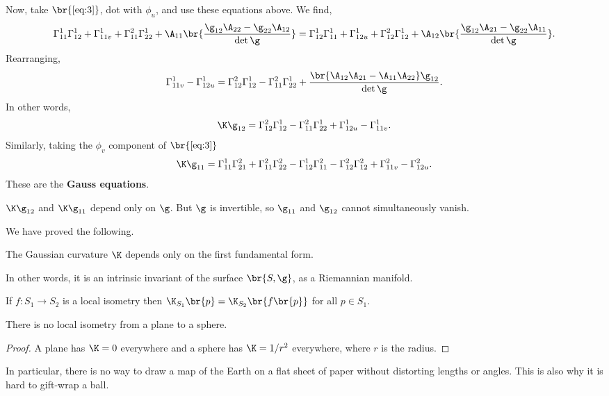 Now, take $ \br{\ref{eq:3}} $, dot with $ \phi_u $, and use these equations above. We find,
$$ \Gamma_{11}^1\Gamma_{12}^1 + \Gamma_{11v}^1 + \Gamma_{11}^2\Gamma_{22}^1 + \A_{11}\br{\dfrac{\g_{12}\A_{22} - \g_{22}\A_{12}}{\det \g}} = \Gamma_{12}^1\Gamma_{11}^1 + \Gamma_{12u}^1 + \Gamma_{12}^2\Gamma_{12}^1 + \A_{12}\br{\dfrac{\g_{12}\A_{21} - \g_{22}\A_{11}}{\det \g}}. $$
Rearranging,
$$ \Gamma_{11v}^1 - \Gamma_{12u}^1 = \Gamma_{12}^2\Gamma_{12}^1 - \Gamma_{11}^2\Gamma_{22}^1 + \dfrac{\br{\A_{12}\A_{21} - \A_{11}\A_{22}}\g_{12}}{\det \g}. $$
In other words,
$$ \K \g_{12} = \Gamma_{12}^2\Gamma_{12}^1 - \Gamma_{11}^2\Gamma_{22}^1 + \Gamma_{12u}^1 - \Gamma_{11v}^1. $$
Similarly, taking the $ \phi_v $ component of $ \br{\ref{eq:3}} $
$$ \K \g_{11} = \Gamma_{11}^1\Gamma_{21}^2 + \Gamma_{11}^2\Gamma_{22}^2 - \Gamma_{12}^1\Gamma_{11}^2 - \Gamma_{12}^2\Gamma_{12}^2 + \Gamma_{11v}^2 - \Gamma_{12u}^2. $$
These are the \textbf{Gauss equations}.

\begin{note*}
$ \K \g_{12} $ and $ \K \g_{11} $ depend only on $ \g $. But $ \g $ is invertible, so $ \g_{11} $ and $ \g_{12} $ cannot simultaneously vanish.
\end{note*}

We have proved the following.

\begin{theorem}
The Gaussian curvature $ \K $ depends only on the first fundamental form.
\end{theorem}

In other words, it is an intrinsic invariant of the surface $ \br{S, \g} $, as a Riemannian manifold.

\pagebreak

\begin{corollary}
If $ f : S_1 \to S_2 $ is a local isometry then $ \K_{S_1}\br{p} = \K_{S_2}\br{f\br{p}} $ for all $ p \in S_1 $.
\end{corollary}

\begin{corollary}
There is no local isometry from a plane to a sphere.
\end{corollary}

\begin{proof}
A plane has $ \K = 0 $ everywhere and a sphere has $ \K = 1 / r^2 $ everywhere, where $ r $ is the radius.
\end{proof}

In particular, there is no way to draw a map of the Earth on a flat sheet of paper without distorting lengths or angles. This is also why it is hard to gift-wrap a ball.


